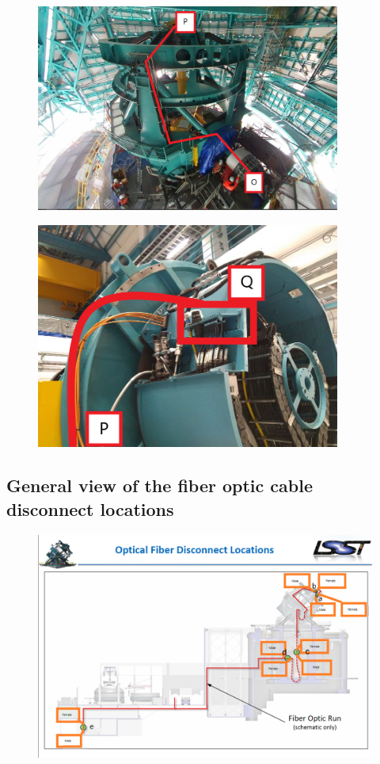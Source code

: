 \begin{figure}
  \centering
  \includegraphics[width=10cm]{images/33.png}
\end{figure}

\begin{figure}
  \centering
  \includegraphics[width=10cm]{images/34.png}
\end{figure}


\newpage

\subsection{General view of the fiber optic cable disconnect locations}

\begin{figure}
  \includegraphics[width=\textwidth]{images/33333.png}
\end{figure}

